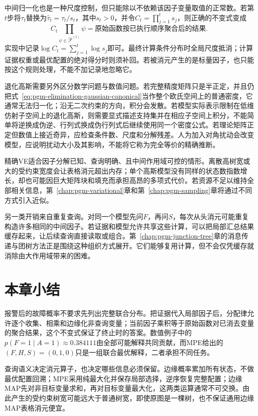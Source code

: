 中间归一化也是一种尺度控制，但只能除以不依赖该因子变量取值的正常数。若第$t$步将$\tau_t$替换为$\widehat{\tau}_t=\tau_t/s_t$，其中$s_t>0$，并令$C_t=\prod_{j=1}^t s_j$，则正确的不变式变成
\[
  C_t\prod_{\psi\in\widehat{\mathcal{F}}^{(t)}}\psi
  =\text{原始函数按已执行顺序聚合后的结果}.
\]
实现中记录$\log C_t=\sum_{j=1}^t\log s_j$即可。最终计算条件分布时全局尺度抵消；计算证据权重或最优配置的绝对得分时则须补回。若被消元产生的是标量因子，也只能按这个规则处理，不能不加记录地忽略它。

退化高斯需要另外区分数学问题与数值问题。若完整精度矩阵只是半正定，并且仍把式~\eqref{eq:pgm-elimination-gaussian-canonical}当作整个欧氏空间上的普通密度，它通常无法归一化；沿无二次约束的方向，积分会发散。若模型实际表示限制在低维仿射子空间上的退化高斯，则需要显式描述支持集并在相应子空间上积分，不能简单将逆换成伪逆、行列式换成伪行列式后继续使用同一个密度公式。若理论矩阵正定但数值上接近奇异，应检查条件数、尺度和分解残差。人为加入对角扰动会改变模型，应说明扰动大小及其影响，不能将它称为完全等价的精确推断。

精确VE适合因子分解已知、查询明确、且中间作用域可控的情形。离散高树宽或大的受约束宽度会让表格消元超出内存；单个高斯模型没有同样的状态数指数增长，却也可能因巨大矩阵块和填充而承担高昂的多项式代价。若资源不足以维持全部相关信息，第~\ref{chap:pgm-variational}章和第~\ref{chap:pgm-sampling}章将通过不同方式引入近似。

另一类开销来自重复查询。对同一个模型先问$F$，再问$S$，每次从头消元可能重复构造许多相同的中间因子。若证据和模型允许共享这些计算，可以把局部汇总结果缓存起来，让后续查询直接读取或组合。第~\ref{chap:pgm-junction-tree}章的消息传递与团树方法正是围绕这种组织方式展开。它们能够复用计算，但不会仅凭缓存就消除由大作用域带来的困难。

\section{本章小结}
\label{sec:pgm-elimination-summary}

报警后的故障概率不要求先列出完整联合分布。把证据代入局部因子后，分配律允许逐个收集、相乘和边缘化非查询变量；当前因子乘积等于原始函数对已消去变量的聚合结果，这个不变式保证了终止时的答案。数值例子中的$p(F=1\mid A=1)\approx0.384111$由全部可能解释共同贡献，而MPE给出的$(F,H,S)=(0,1,0)$只是一组联合最优解释，二者承担不同任务。

查询语义决定消元算子，也决定哪些信息必须保留。边缘概率累加所有状态，不做最优配置回溯；MPE采用纯最大化并保存局部选择，逆序恢复完整配置；边缘MAP先对非目标变量求和，再对目标变量最大化，这两类运算通常不可交换。由此产生的受约束树宽可能远大于普通树宽，即使原图是一棵树，也不保证通用边缘MAP表格消元便宜。

